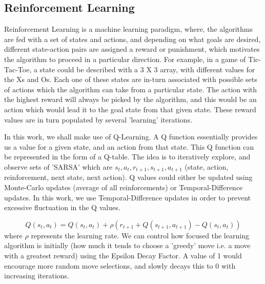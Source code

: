 \documentclass[conference, 10pt]{IEEEtran}
\begin{document}
\subsection{Reinforcement Learning}
\label{sec:back:prev}
Reinforcement Learning is a machine learning paradigm, where, the algorithms are fed with a set of states and actions, and depending on what goals are desired, different state-action pairs are assigned a reward or punishment, which motivates the algorithm to proceed in a particular direction. For example, in a game of Tic-Tac-Toe, a state could be described with a 3 X 3 array, with different values for the Xs and Os. Each one of these states are in-turn associated with possible sets of actions which the algorithm can take from a particular state. The action with the highest reward will always be picked by the algorithm, and this would be an action which would lead it to the goal state from that given state. These reward values are in turn populated by several 'learning' iterations. 

In this work, we shall make use of Q-Learning. A Q function essentially provides us a value for a given state, and an action from that state. This Q function can be represented in the form of a Q-table. The idea is to iteratively explore, and observe sets of 'SARSA' which are $s_t, a_t, r_{t+1}, s_{t+1}, a_{t+1}$ (state, action, reinforcement, next state, next action). Q values could either be updated using Monte-Carlo updates (average of all reinforcements) or Temporal-Difference updates. In this work, we use Temporal-Difference updates in order to prevent excessive fluctuation in the Q values. 

$$Q(s_t,a_t) = Q(s_t,a_t) + \rho (r_{t+1} + Q(s_{t+1},a_{t+1}) - Q(s_t,a_t))$$
where $\rho$ represents the learning rate. We can control how focused the learning algorithm is initially (how much it tends to choose a 'greedy' move i.e. a move with a greatest reward) using the Epsilon Decay Factor. A value of 1 would encourage more random move selections, and slowly decays this to 0 with increasing iterations. 
\end{document}
